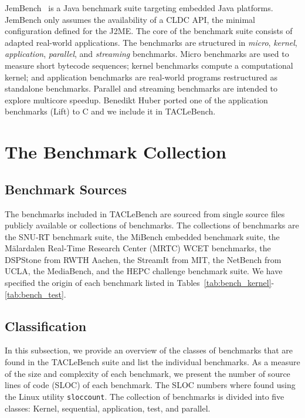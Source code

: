 \documentclass[a4paper,UKenglish]{oasics}
\newcommand{\todo}[1]{{\emph{TODO: #1}}}
\newcommand{\martin}[1]{{\color{blue} Martin: #1}}
\newcommand{\code}[1]{{\small{\texttt{#1}}}}
\begin{document}
JemBench~\cite{jembench} is a Java benchmark suite targeting
embedded Java platforms. JemBench only assumes the
availability of a CLDC API, the minimal configuration
defined for the J2ME. The core of the benchmark suite consists of
adapted real-world applications.
The benchmarks are structured in {\em micro}, {\em kernel}, {\em
application}, {\em parallel}, and {\em streaming} benchmarks.
Micro benchmarks are used to measure short bytecode sequences;
kernel benchmarks compute a computational kernel; and application
benchmarks are real-world programs restructured as standalone benchmarks.
Parallel and streaming benchmarks are intended to explore multicore
speedup.
Benedikt Huber ported one of the application benchmarks (Lift) to C
and we include it in TACLeBench.




\section{The Benchmark Collection}
\label{sec:collect}


\subsection{Benchmark Sources}
The benchmarks included in TACLeBench are sourced from single source files publicly available or collections of benchmarks.
The collections of benchmarks are the SNU-RT benchmark suite, the MiBench embedded benchmark suite, the M{\"a}lardalen Real-Time Research Center (MRTC) WCET benchmarks, the DSPStone from RWTH Aachen, the StreamIt from MIT, the NetBench from UCLA, the MediaBench, and the HEPC challenge benchmark suite.
We have specified the origin of each benchmark listed in Tables~\ref{tab:bench_kernel}-\ref{tab:bench_test}.


\subsection{Classification}
In this subsection, we provide an overview of the classes of benchmarks that are found in the TACLeBench suite and list the individual benchmarks.
As a measure of the size and complexity of each benchmark, we present the number of source lines of code (SLOC) of each benchmark.
The SLOC numbers where found using the Linux utility \code{sloccount}.
The collection of benchmarks is divided into five classes: Kernel, sequential, application, test, and parallel.
\end{document}
